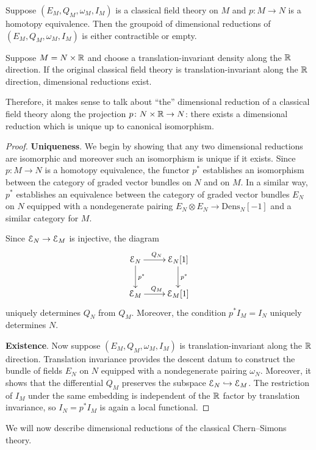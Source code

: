 \documentclass[10pt, oneside]{article}
\newcommand{\Dens}{\mathrm{Dens}}
\begin{document}
\begin{prop}
Suppose $(E_M, Q_M, \omega_M, I_M)$ is a classical field theory on $M$ and $p\colon M\rightarrow N$ is a homotopy equivalence. Then the groupoid of dimensional reductions of $(E_M, Q_M, \omega_M, I_M)$ is either contractible or empty.

Suppose $M=N\times \mathbb R$ and choose a translation-invariant density along the $\mathbb R$ direction. If the original classical field theory is translation-invariant along the $\mathbb R$ direction, dimensional reductions exist.
\label{prop:dimensionalreductionunique}
\end{prop}

Therefore, it makes sense to talk about ``the'' dimensional reduction of a classical field theory along the projection $p \colon N \times \mathbb R \to N$: there exists a dimensional reduction which is unique up to canonical isomorphism.

\begin{proof} \textbf{Uniqueness}. We begin by showing that any two dimensional reductions are isomorphic and moreover such an isomorphism is unique if it exists. Since $p\colon M\rightarrow N$ is a homotopy equivalence, the functor $p^*$ establishes an isomorphism between the category of graded vector bundles on $N$ and on $M$. In a similar way, $p^*$ establishes an equivalence between the category of graded vector bundles $E_N$ on $N$ equipped with a nondegenerate pairing $E_N\otimes E_N\rightarrow \Dens_N[-1]$ and a similar category for $M$.

Since $\mathcal E_N\rightarrow \mathcal E_M$ is injective, the diagram
\[
\xymatrix{
\cE_N \ar^{Q_N}[r] \ar^{p^*}[d] & \cE_N[1] \ar^{p^*}[d] \\
\cE_M \ar^{Q_M}[r] & \cE_M[1]
}
\]
uniquely determines $Q_N$ from $Q_M$. Moreover, the condition $p^* I_M = I_N$ uniquely determines $N$.

\textbf{Existence}. Now suppose $(E_M, Q_M, \omega_M, I_M)$ is translation-invariant along the $\mathbb R$ direction. Translation invariance provides the descent datum to construct the bundle of fields $E_N$ on $N$ equipped with a nondegenerate pairing $\omega_N$. Moreover, it shows that the differential $Q_M$ preserves the subspace $\mathcal E_N\hookrightarrow \mathcal E_M$. The restriction of $I_M$ under the same embedding is independent of the $\mathbb R$ factor by translation invariance, so $I_N=p^* I_M$ is again a local functional.
\end{proof}

We will now describe dimensional reductions of the classical Chern--Simons theory.
\end{document}
